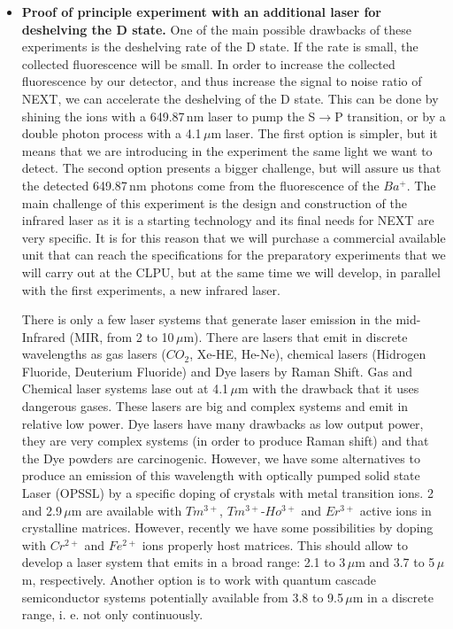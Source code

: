 \begin{itemize}
  \item \textbf{Proof of principle experiment with an additional laser for deshelving the D state.}
  One of the main possible drawbacks of these experiments is the deshelving rate of the D state. If the rate is small, the collected fluorescence will be small. In order to increase the collected fluorescence by our detector, and thus increase the signal to noise ratio of NEXT, we can accelerate the deshelving of the D state. This can be done by shining the ions with a 649.87\,nm laser to pump the S$\rightarrow$P transition, or by a double photon process with a 4.1\,$\mu$m laser. The first option is simpler, but it means that we are introducing in the experiment the same light we want to detect. The second option presents a bigger challenge, but will assure us that the detected  649.87\,nm photons come from the fluorescence of the $Ba^{+}$. The main challenge of this experiment is the design and construction of the infrared laser as it is a starting technology and its final needs for NEXT are very specific. It is for this reason that we will purchase a commercial available unit that can reach the specifications for the preparatory experiments that we will carry out at the CLPU, but at the same time we will develop, in parallel with the first experiments, a new infrared laser. 
  
There is only a few laser systems that generate laser emission in the mid-Infrared (MIR, from 2 to 10\,$\mu$m). There are lasers that emit in discrete wavelengths as gas lasers ($CO_2$, Xe-HE, He-Ne), chemical lasers (Hidrogen Fluoride, Deuterium Fluoride) and Dye lasers by Raman Shift. Gas and Chemical laser systems lase out at 4.1\,$\mu$m with the drawback that it uses dangerous gases. These lasers are big and complex systems and emit in relative low power. Dye lasers have many drawbacks as low output power, they are very complex systems (in order to produce Raman shift) and that the Dye powders are carcinogenic. However, we have some alternatives to produce an emission of this wavelength with optically pumped solid state Laser (OPSSL) by a specific doping of crystals with metal transition ions. 2 and 2.9\,$\mu$m are available with $Tm^{3+}$, $Tm^{3+}$-$Ho^{3+}$ and $Er^{3+}$ active ions in crystalline matrices. However, recently we have some possibilities by doping with $Cr^{2+}$ and $Fe^{2+}$ ions properly host matrices. This should allow to develop a laser system that emits in a broad range: 2.1 to 3\,$\mu$m and 3.7 to 5\,$\mu$m, respectively. Another option is to work with quantum cascade semiconductor systems potentially available from 3.8 to 9.5\,$\mu$m in a discrete range, i. e.  not only continuously. 


\end{itemize}
